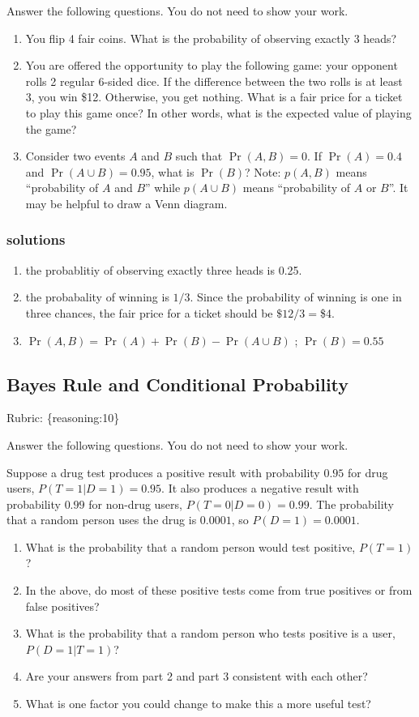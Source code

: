 \documentclass{article}
\def\rubric#1{\gre{Rubric: \{#1\}}}{}
\def\blu#1{{\color{blu}#1}}
\def\gre#1{{\color{gre}#1}}
\def\red#1{{\color{red}#1}}
\def\enum#1{\begin{enumerate}#1\end{enumerate}}
\begin{document}
\blu{Answer the following questions.} You do not need to show your work.

\begin{enumerate}
\item You flip 4 fair coins. What is the probability of observing \red{exactly} 3 heads?
\item You are offered the opportunity to play the following game: your opponent rolls 2 regular 6-sided dice. If the difference between the two rolls is at least 3, you win \$12. Otherwise, you get nothing. What is a fair price for a ticket to play this game once? In other words, what is the expected value of playing the game?
\item Consider two events $A$ and $B$ such that $\Pr(A, B)=0$. If $\Pr(A) = 0.4$ and $\Pr(A \cup B) = 0.95$, what is $\Pr(B)$? Note: $p(A, B)$ means
``probability of $A$ and $B$'' while $p(A \cup B)$ means ``probability of $A$ or $B$''. It may be helpful to draw a Venn diagram.
\end{enumerate}

\subsubsection{solutions}
\enum{
\item the probablitiy of observing exactly three heads is 0.25.
\item the probabality of winning is $1/3$. Since the probability of winning is one in three chances, the fair price for a ticket should be $\$12/3 =$\$4.
\item $\Pr(A, B)= \Pr(A) +\Pr(B) -\Pr(A \cup B) $ ; $\Pr(B) = 0.55$ 
}
\subsection{Bayes Rule and Conditional Probability}
\rubric{reasoning:10}

\blu{Answer the following questions.} You do not need to show your work.

Suppose a drug test produces a positive result with probability $0.95$ for drug users, $P(T=1|D=1)=0.95$. It also produces a negative result with probability $0.99$ for non-drug users, $P(T=0|D=0)=0.99$. The probability that a random person uses the drug is $0.0001$, so $P(D=1)=0.0001$. 

\begin{enumerate}
\item What is the probability that a random person would test positive, $P(T=1)$?
\item In the above, do most of these positive tests come from true positives or from false positives? 
\item What is the probability that a random person who tests positive is a user, $P(D=1|T=1)$?
\item Are your answers from part 2 and part 3 consistent with each other?
\item What is one factor you could change to make this a more useful test?
\end{enumerate}
\end{document}
